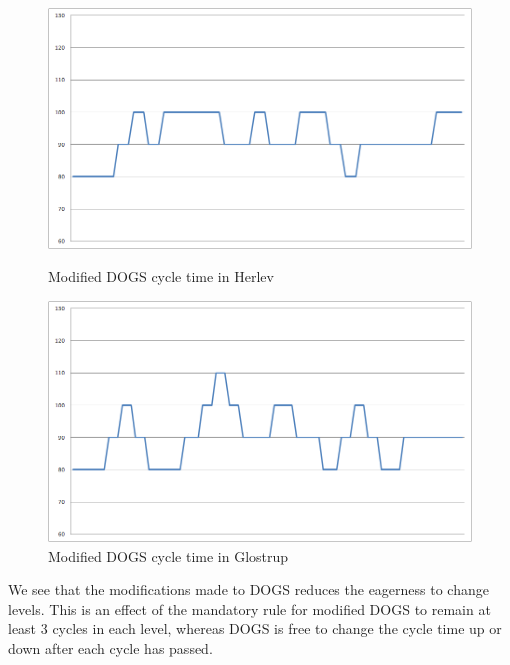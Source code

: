 \begin{figure}[ht]
        \begin{minipage}[b]{0.5\linewidth}

\begin{center}
\includegraphics[scale=0.2]{C_modified-dogs_herlev.png} 
\end{center}
\caption{Modified DOGS cycle time in Herlev}
\label{fig:c_modified-dogs_herlev}

    \end{minipage}
    \hspace{0.1cm}
    \begin{minipage}[b]{0.5\linewidth}

\begin{center}
\includegraphics[scale=0.2]{C_modified-dogs_glostrup.png} 
\end{center}
\caption{Modified DOGS cycle time in Glostrup}
\label{fig:c_modified-dogs_glostrup}

    \end{minipage}

\end{figure}

We see that the modifications made to DOGS reduces the eagerness to change levels. This is an effect of the mandatory rule for modified DOGS to remain at least 3 cycles in each level, whereas DOGS is free to change the cycle time up or down after each cycle has passed. 

